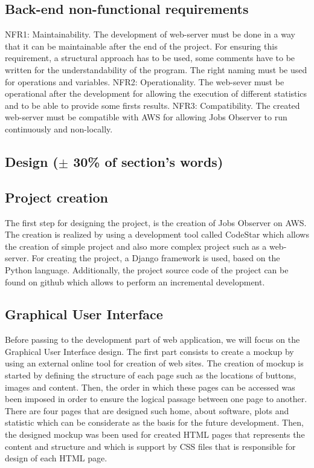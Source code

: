 \documentclass[conference,compsoc]{IEEEtran}
\begin{document}
\subsection{Back-end non-functional requirements}
NFR1: Maintainability. The development of web-server must be done in a way that it can be maintainable after the end of the project. For ensuring this requirement, a structural approach has to be used, some comments have to be written for the understandability of the program. The right naming must be used for operations and variables. 
\newline\newline
NFR2: Operationality. The web-sever must be operational after the development for allowing the execution of different statistics and to be able to provide some firsts results. 
\newline\newline
NFR3: Compatibility. The created web-server must be compatible with AWS for allowing Jobs Observer to run continuously and non-locally. 

\subsection{Design ($\pm$ 30\% of section's words)}
\subsection{Project creation}
The first step for designing the project, is the creation of Jobs Observer on AWS. The creation is realized by using a development tool called CodeStar which allows the creation of simple project and also more complex project such as a web-server. For creating the project, a Django framework is used, based on the Python language. Additionally, the project source code of the project can be found on github which allows to perform an incremental development.
 
\subsection{Graphical User Interface}
Before passing to the development part of web application, we will focus on the Graphical User Interface design. The first part consists to create a mockup by using an external online tool for creation of web sites. The creation of mockup is started by defining the structure of each page such as the locations of buttons, images and content. Then, the order in which these pages can be accessed was been imposed in order to ensure the logical passage between one page to another. There are four pages that are designed such home, about software, plots and statistic which can be considerate as the basis for the future development. 
Then, the designed mockup was been used for created HTML pages that represents the content and structure and which is support by CSS files that is responsible for design of each HTML page. 
\end{document}
